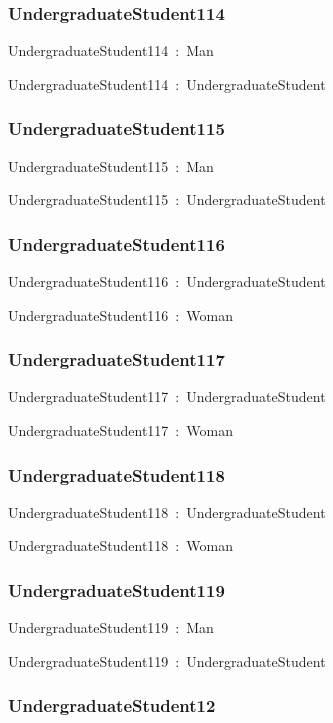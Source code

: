 \documentclass{article}
\begin{document}
\subsubsection*{UndergraduateStudent114}

UndergraduateStudent114~:~Man

UndergraduateStudent114~:~UndergraduateStudent

\subsubsection*{UndergraduateStudent115}

UndergraduateStudent115~:~Man

UndergraduateStudent115~:~UndergraduateStudent

\subsubsection*{UndergraduateStudent116}

UndergraduateStudent116~:~UndergraduateStudent

UndergraduateStudent116~:~Woman

\subsubsection*{UndergraduateStudent117}

UndergraduateStudent117~:~UndergraduateStudent

UndergraduateStudent117~:~Woman

\subsubsection*{UndergraduateStudent118}

UndergraduateStudent118~:~UndergraduateStudent

UndergraduateStudent118~:~Woman

\subsubsection*{UndergraduateStudent119}

UndergraduateStudent119~:~Man

UndergraduateStudent119~:~UndergraduateStudent

\subsubsection*{UndergraduateStudent12}
\end{document}
